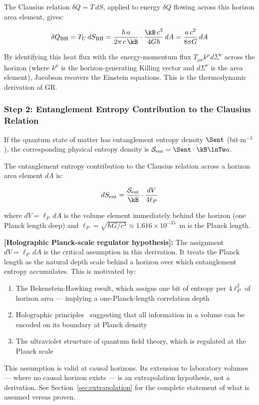 The Clausius relation $\delta Q = T\,dS$, applied to energy $\delta Q$
flowing across this horizon area element, gives:

\begin{equation}
    \delta Q_{\mathrm{BH}} = T_U\,dS_{\mathrm{BH}}
    = \frac{\hbar\,a}{2\pi\,c\,\kB} \cdot \frac{\kB\,c^3}{4G\hbar}\,dA
    = \frac{a\,c^2}{8\pi G}\,dA
    \label{eq:clausius_bh}
\end{equation}

\noindent By identifying this heat flux with the energy-momentum flux
$T_{\mu\nu}k^\mu d\Sigma^\nu$ across the horizon (where $k^\mu$ is the
horizon-generating Killing vector and $d\Sigma^\nu$ is the area element),
Jacobson recovers the Einstein equations. This is the thermodynamic
derivation of GR.

\subsubsection{Step 2: Entanglement Entropy Contribution to the Clausius
Relation}

If the quantum state of matter has entanglement entropy density $\Sent$
(bit$\cdot$m$^{-3}$), the corresponding physical entropy density is
$\mathcal{S}_{\mathrm{ent}} = \Sent\cdot\kB\lnTwo$.

The entanglement entropy contribution to the Clausius relation across a
horizon area element $dA$ is:

\begin{equation}
    dS_{\mathrm{ent}} = \frac{\mathcal{S}_{\mathrm{ent}}}{\kB}\cdot
    \frac{dV}{4\ell_P}
    \label{eq:dS_ent}
\end{equation}

\noindent where $dV = \ell_P\,dA$ is the volume element immediately behind
the horizon (one Planck length deep) and
$\ell_P = \sqrt{\hbar G/c^3} \approx 1.616\times10^{-35}$~m is the
Planck length.

\begin{framed}
\noindent\textbf{[Holographic Planck-scale regulator hypothesis]:}
The assignment $dV = \ell_P\,dA$ is the critical assumption in this
derivation. It treats the Planck length as the natural depth scale behind
a horizon over which entanglement entropy accumulates. This is motivated by:
\begin{enumerate}
    \item The Bekenstein-Hawking result, which assigns one bit of entropy
    per $4\ell_P^2$ of horizon area --- implying a one-Planck-length
    correlation depth
    \item Holographic principles~\cite{susskind1995} suggesting that all
    information in a volume can be encoded on its boundary at Planck
    density
    \item The ultraviolet structure of quantum field theory, which is
    regulated at the Planck scale
\end{enumerate}
This assumption is valid at causal horizons. Its extension to laboratory
volumes --- where no causal horizon exists --- is an extrapolation
hypothesis, not a derivation. See Section~\ref{sec:extrapolation} for the
complete statement of what is assumed versus proven.
\end{framed}

